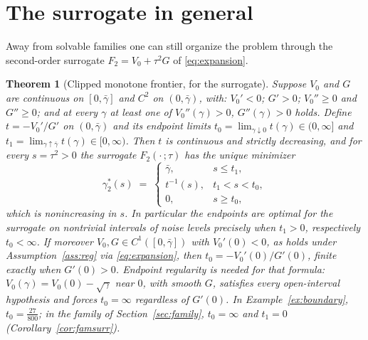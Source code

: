 \documentclass[11pt]{article}
\newtheorem{theorem}{Theorem}
\theoremstyle{remark}
\begin{document}
\section{The surrogate in general}
\label{sec:frontier}

Away from solvable families one can still organize the problem through the
second-order surrogate $F_2 = V_0 + \tau^2 G$ of \eqref{eq:expansion}.

\begin{theorem}[Clipped monotone frontier, for the surrogate]
\label{thm:frontier}
Suppose $V_0$ and $G$ are continuous on $[0, \bar\gamma]$ and $C^2$ on
$(0, \bar\gamma)$, with: $V_0' < 0$; $G' > 0$; $V_0'' \ge 0$ and
$G'' \ge 0$; and at every $\gamma$ at least one of $V_0''(\gamma) > 0$,
$G''(\gamma) > 0$ holds. Define $t = -V_0'/G'$ on $(0,\bar\gamma)$ and its
endpoint limits $t_0 = \lim_{\gamma \downarrow 0} t(\gamma) \in (0, \infty]$
and $t_1 = \lim_{\gamma \uparrow \bar\gamma} t(\gamma) \in [0, \infty)$.
Then $t$ is continuous and strictly decreasing, and for every
$s = \tau^2 > 0$ the surrogate $F_2(\cdot\,; \tau)$ has the unique minimizer
\begin{equation}
  \gamma_2^*(s) \;=\;
  \begin{cases}
    \bar\gamma, & s \le t_1, \\
    t^{-1}(s), & t_1 < s < t_0, \\
    0, & s \ge t_0,
  \end{cases}
  \label{eq:clipped}
\end{equation}
which is nonincreasing in $s$. In particular the endpoints are optimal for
the surrogate on nontrivial intervals of noise levels precisely when
$t_1 > 0$, respectively $t_0 < \infty$. If moreover
$V_0, G \in C^1([0,\bar\gamma])$ with $V_0'(0) < 0$, as holds under
Assumption~\ref{ass:reg} via \eqref{eq:expansion}, then
$t_0 = -V_0'(0)/G'(0)$, finite exactly when $G'(0) > 0$. Endpoint
regularity is needed for that formula: $V_0(\gamma) = V_0(0) - \sqrt\gamma$
near $0$, with smooth $G$, satisfies every open-interval hypothesis and
forces $t_0 = \infty$ regardless of $G'(0)$. In
Example~\ref{ex:boundary}, $t_0 = \tfrac{27}{800}$; in the family of
Section~\ref{sec:family}, $t_0 = \infty$ and $t_1 = 0$
(Corollary~\ref{cor:famsurr}).
\end{theorem}
\end{document}
